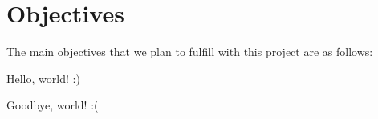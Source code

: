 \section{Objectives}

The main objectives that we plan to fulfill with this project are as follows:

\begin{itemize*}
    \item{} Hello, world! :)
    \item{} Goodbye, world! :(
\end{itemize*}
